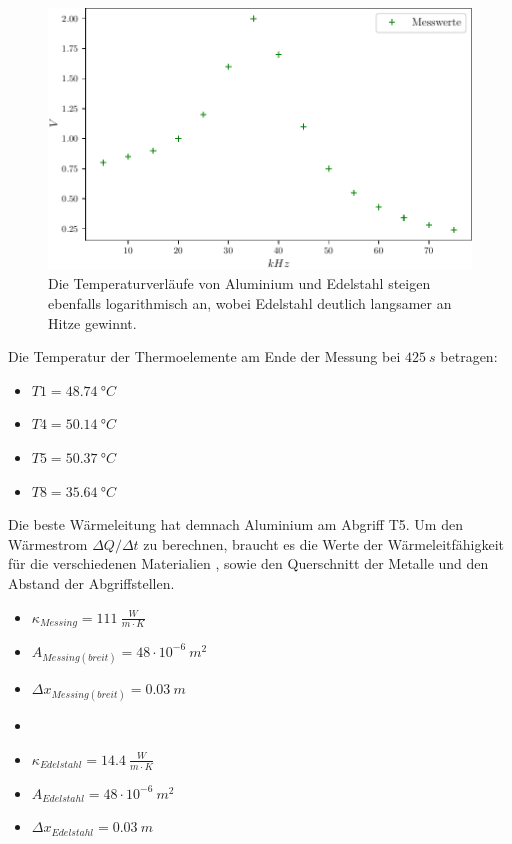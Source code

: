 \begin{figure}
    \centering
    \includegraphics{build/plot2.pdf}
    \caption{Die Temperaturverläufe von Aluminium und Edelstahl steigen ebenfalls logarithmisch an, wobei Edelstahl deutlich langsamer an Hitze gewinnt.}
    \label{fig:45grad2}
\end{figure}
\newpage
Die Temperatur der Thermoelemente am Ende der Messung bei $425\ s$ betragen:

\begin{itemize}
    \centering
    \item[] $T1 = 48.74\ °C$ 
    \item[] $T4 = 50.14\ °C$
    \item[] $T5 = 50.37\ °C$
    \item[] $T8 = 35.64\ °C$
\end{itemize}

Die beste Wärmeleitung hat demnach Aluminium am Abgriff T5.
\newpage
Um den Wärmestrom $\Delta Q/\Delta t$ zu berechnen, braucht es die Werte der Wärmeleitfähigkeit für die verschiedenen Materialien \cite{web}, sowie den Querschnitt der Metalle und den Abstand der Abgriffstellen.
\begin{itemize}
    \item[] $\kappa_{Messing} = 111\ \frac{W}{m\cdot K}$
    \item[] $A_{Messing(breit)} = 48\cdot 10^{-6}\ m^2$
    \item[] $\Delta x_{Messing(breit)} = 0.03\ m$ 
    \item[] 
    \item[] $\kappa_{Edelstahl} = 14.4\ \frac{W}{m\cdot K}$
    \item[] $A_{Edelstahl} = 48\cdot 10^{-6}\ m^2$
    \item[] $\Delta x_{Edelstahl} = 0.03\ m$ 
\end{itemize}

